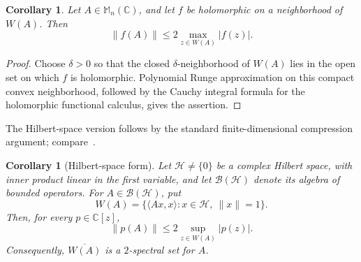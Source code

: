 \documentclass{aomart}
\newtheorem{corollary}[theorem]{Corollary}
\theoremstyle{definition}
\newcommand{\C}{\mathbb C}
\newcommand{\Mn}{\mathbb M_n(\C)}
\begin{document}
\begin{corollary}
\label{cor:holomorphic-bound}
Let $A\in\Mn$, and let $f$ be holomorphic on a neighborhood of
$W(A)$.  Then
\begin{equation}
  \lVert f(A)\rVert
  \leq2\max_{z\in W(A)}\lvert f(z)\rvert.
  \label{eq:holomorphic-bound}
\end{equation}
\end{corollary}

\begin{proof}
Choose $\delta>0$ so that the closed $\delta$-neighborhood of $W(A)$
lies in the open set on which $f$ is holomorphic.  Polynomial Runge
approximation on this compact convex neighborhood, followed by the
Cauchy integral formula for the holomorphic functional calculus, gives
the assertion.
\end{proof}

The Hilbert-space version follows by the standard finite-dimensional
compression argument; compare~\cite{BickelEtAl2020}.

\begin{corollary}[Hilbert-space form]
\label{cor:operator-bound}
Let $\mathcal H\neq\{0\}$ be a complex Hilbert space, with inner
product linear in the first variable, and let $\mathcal B(\mathcal H)$
denote its algebra of bounded operators.  For
$A\in\mathcal B(\mathcal H)$, put
\[
  W(A)=\{\langle Ax,x\rangle:x\in\mathcal H,\ \lVert x\rVert=1\}.
\]
Then, for every $p\in\C[z]$,
\begin{equation}
  \lVert p(A)\rVert
  \leq 2\sup_{z\in W(A)}\lvert p(z)\rvert.
  \label{eq:operator-polynomial-bound}
\end{equation}
Consequently, $\overline{W(A)}$ is a $2$-spectral set for $A$.
\end{corollary}
\end{document}
